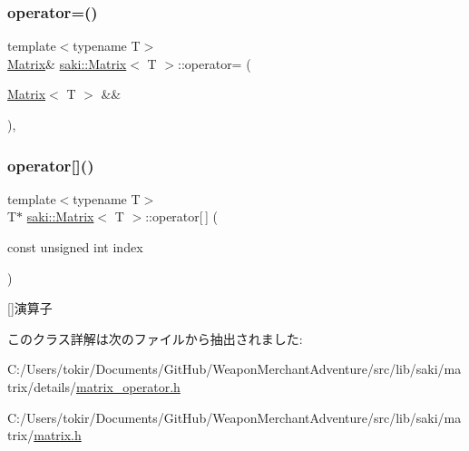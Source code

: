 \mbox{\label{classsaki_1_1_matrix_a96b3519d691108a606d4ece3a9bac134}} 
\subsubsection{\texorpdfstring{operator=()}{operator=()}\hspace{0.1cm}{\footnotesize\ttfamily [2/2]}}
{\footnotesize\ttfamily template$<$typename T$>$ \\
\mbox{\hyperlink{classsaki_1_1_matrix}{Matrix}}\& \mbox{\hyperlink{classsaki_1_1_matrix}{saki\+::\+Matrix}}$<$ T $>$\+::operator= (\begin{DoxyParamCaption}\item[{\mbox{\hyperlink{classsaki_1_1_matrix}{Matrix}}$<$ T $>$ \&\&}]{ }\end{DoxyParamCaption})\hspace{0.3cm}{\ttfamily [default]}, {\ttfamily [noexcept]}}

\mbox{\label{classsaki_1_1_matrix_ad1fa9ab13d6ab9def73a4ac5bfa15cf4}} 
\subsubsection{\texorpdfstring{operator[]()}{operator[]()}}
{\footnotesize\ttfamily template$<$typename T$>$ \\
T$\ast$ \mbox{\hyperlink{classsaki_1_1_matrix}{saki\+::\+Matrix}}$<$ T $>$\+::operator\mbox{[}$\,$\mbox{]} (\begin{DoxyParamCaption}\item[{const unsigned int}]{index }\end{DoxyParamCaption})\hspace{0.3cm}{\ttfamily [inline]}}



\mbox{[}\mbox{]}演算子 



このクラス詳解は次のファイルから抽出されました\+:\begin{DoxyCompactItemize}
\item 
C\+:/\+Users/tokir/\+Documents/\+Git\+Hub/\+Weapon\+Merchant\+Adventure/src/lib/saki/matrix/details/\mbox{\hyperlink{matrix__operator_8h}{matrix\+\_\+operator.\+h}}\item 
C\+:/\+Users/tokir/\+Documents/\+Git\+Hub/\+Weapon\+Merchant\+Adventure/src/lib/saki/matrix/\mbox{\hyperlink{matrix_8h}{matrix.\+h}}\end{DoxyCompactItemize}

